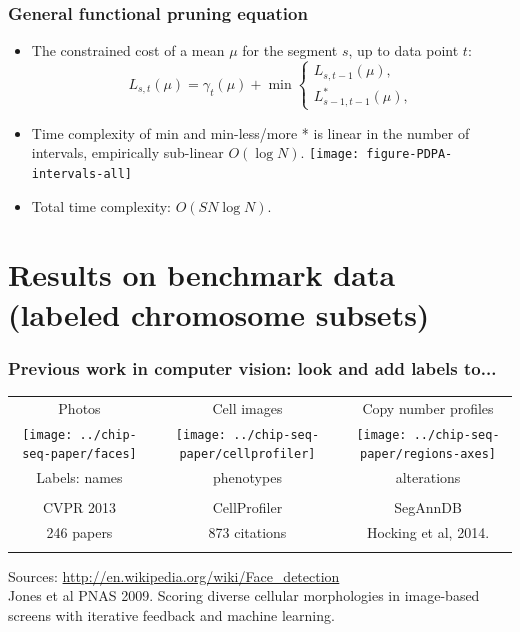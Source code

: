 \documentclass{beamer}
\begin{document}
\begin{frame}
  \frametitle{General functional pruning equation}
  \begin{itemize}
  \item The constrained cost of a mean $\mu$ for the segment $s$,
    up to data point $t$:
    \begin{equation*}
      L_{s,t}(\mu) = \gamma_t(\mu) + \min
      \begin{cases}
        L_{s,t-1}(\mu),\\
        L_{s-1,t-1}^{*}(\mu),
      \end{cases}
    \end{equation*}
  \item Time complexity of min and min-less/more * is linear in the
    number of intervals, empirically sub-linear $O(\log N)$.
    \texttt{[image: figure-PDPA-intervals-all]}
  \item Total time complexity: $O(S N\log N)$.
  \end{itemize}
\end{frame}

\section{Results on benchmark data (labeled chromosome subsets)}

\begin{frame}
  \frametitle{Previous work in computer vision: look and add labels
    to...}
  \begin{tabular}{ccc}
    Photos & Cell images & Copy number profiles \\
    \texttt{[image: ../chip-seq-paper/faces]} &
    \texttt{[image: ../chip-seq-paper/cellprofiler]} &
    \texttt{[image: ../chip-seq-paper/regions-axes]}\\
    Labels: names & phenotypes & alterations \\ \\
    CVPR 2013 & CellProfiler & SegAnnDB \\
    246 papers & 873 citations & Hocking et al, 2014. \\
     &
  \end{tabular}
  Sources: \url{http://en.wikipedia.org/wiki/Face_detection}\\
  Jones et al PNAS 2009. Scoring diverse cellular morphologies in
  image-based screens with iterative feedback and machine learning.
\end{frame}
\end{document}
